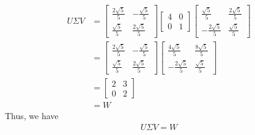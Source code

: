 \documentclass{article}
\begin{document}
\begin{align*}
    U\Sigma V &= \begin{bmatrix}
\frac{2 \sqrt{5}}{5} & -\frac{\sqrt{5}}{5} \\
\frac{\sqrt{5}}{5} & \frac{2 \sqrt{5}}{5}
\end{bmatrix}\begin{bmatrix}
4 & 0 \\
0 & 1
\end{bmatrix}  \begin{bmatrix}
\frac{\sqrt5 }{5} & \frac{2\sqrt{5}}{5} \\
-\frac{2\sqrt{5}}{5} & \frac{\sqrt 5 }{5}
\end{bmatrix} \\
              &= \begin{bmatrix}
\frac{2 \sqrt{5}}{5} & -\frac{\sqrt{5}}{5} \\
\frac{\sqrt{5}}{5} & \frac{2 \sqrt{5}}{5}
\end{bmatrix} \begin{bmatrix}
              \frac{4 \sqrt{5}}{5} & \frac{8 \sqrt{5}}{5} \\
              -\frac{2 \sqrt{5}}{5} & \frac{\sqrt{5}}{5}
              \end{bmatrix}\\
&= \begin{bmatrix}
2 & 3 \\
0 & 2
\end{bmatrix}\\
&= W
\end{align*}
Thus, we have
\begin{align*}
    U\Sigma V = W
\end{align*}
\end{document}
